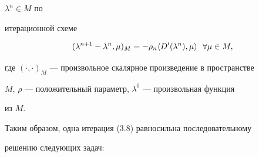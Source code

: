 $\lambda^n\in M$ по 


итерационной схеме 


\begin{equation} 


(\lambda^{n+1}-\lambda^n,\mu)_M=-\rho_n\la 


D'(\lambda^n),\mu\ra\ \ \forall\mu\in M, 


\end{equation} 


где $(\cdot,\cdot)_M$ --- произвольное скалярное произведение в пространстве 


$M$, $\rho$ --- положительный параметр, $\lambda^0$ --- произвольная функция 


из $M$. 


 


Таким образом, одна итерация (3.8) равносильна последовательному 


решению следующих задач: 


